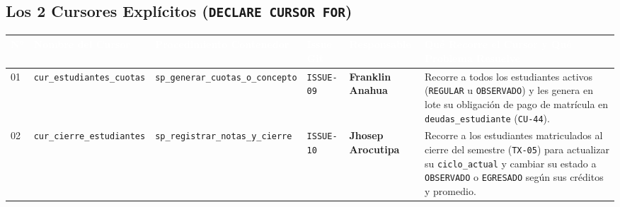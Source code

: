 \documentclass[10pt,a4paper,landscape]{article}
\newcommand{\devFranklin}{\textbf{\textcolor{teal!80!black}{Franklin Anahua}} \newline {\scriptsize(Backend / DB)}}
\newcommand{\devJhosep}{\textbf{\textcolor{orange!85!black}{Jhosep Arocutipa}} \newline {\scriptsize(Reportes / UI)}}
\begin{document}
\vspace{2pt}
\subsection{Los 2 Cursores Explícitos (\texttt{DECLARE CURSOR FOR})}
\footnotesize
\renewcommand{\arraystretch}{1.28}
\begin{longtable}{|p{0.5cm}|p{4.8cm}|p{4.8cm}|p{2.0cm}|p{2.5cm}|p{10.6cm}|}
\hline
\rowcolor{unjbgNavy}
\textcolor{white}{\textbf{N°}} & 
\textcolor{white}{\textbf{Nombre del Cursor}} & 
\textcolor{white}{\textbf{Procedimiento Contenedor}} & 
\textcolor{white}{\textbf{Issue Git}} & 
\textcolor{white}{\textbf{Responsable}} & 
\textcolor{white}{\textbf{Qué Recorre el Cursor y Qué Problema Resuelve}} \\
\hline
\endfirsthead
\hline
\endlastfoot

01 & \texttt{cur\_estudiantes\_cuotas} & \texttt{sp\_generar\_cuotas\_o\_concepto} & \texttt{ISSUE-09} & \devFranklin & Recorre a todos los estudiantes activos (\texttt{REGULAR} u \texttt{OBSERVADO}) y les genera en lote su obligación de pago de matrícula en \texttt{deudas\_estudiante} (\texttt{CU-44}). \\
\hline
\rowcolor{rowAlt}
02 & \texttt{cur\_cierre\_estudiantes} & \texttt{sp\_registrar\_notas\_y\_cierre} & \texttt{ISSUE-10} & \devJhosep & Recorre a los estudiantes matriculados al cierre del semestre (\texttt{TX-05}) para actualizar su \texttt{ciclo\_actual} y cambiar su estado a \texttt{OBSERVADO} o \texttt{EGRESADO} según sus créditos y promedio. \\
\hline
\end{longtable}
\normalsize

\vspace{2pt}
\end{document}
